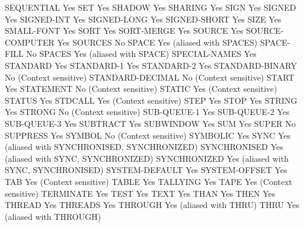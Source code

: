 SEQUENTIAL                      Yes
SET                             Yes
SHADOW                          Yes
SHARING                         Yes
SIGN                            Yes
SIGNED                          Yes
SIGNED-INT                      Yes
SIGNED-LONG                     Yes
SIGNED-SHORT                    Yes
SIZE                            Yes
SMALL-FONT                      Yes
SORT                            Yes
SORT-MERGE                      Yes
SOURCE                          Yes
SOURCE-COMPUTER                 Yes
SOURCES                         No
SPACE                           Yes (aliased with SPACES)
SPACE-FILL                      No
SPACES                          Yes (aliased with SPACE)
SPECIAL-NAMES                   Yes
STANDARD                        Yes
STANDARD-1                      Yes
STANDARD-2                      Yes
STANDARD-BINARY                 No (Context sensitive)
STANDARD-DECIMAL                No (Context sensitive)
START                           Yes
STATEMENT                       No (Context sensitive)
STATIC                          Yes (Context sensitive)
STATUS                          Yes
STDCALL                         Yes (Context sensitive)
STEP                            Yes
STOP                            Yes
STRING                          Yes
STRONG                          No (Context sensitive)
SUB-QUEUE-1                     Yes
SUB-QUEUE-2                     Yes
SUB-QUEUE-3                     Yes
SUBTRACT                        Yes
SUBWINDOW                       Yes
SUM                             Yes
SUPER                           No
SUPPRESS                        Yes
SYMBOL                          No (Context sensitive)
SYMBOLIC                        Yes
SYNC                            Yes (aliased with SYNCHRONISED, SYNCHRONIZED)
SYNCHRONISED                    Yes (aliased with SYNC, SYNCHRONIZED)
SYNCHRONIZED                    Yes (aliased with SYNC, SYNCHRONISED)
SYSTEM-DEFAULT                  Yes
SYSTEM-OFFSET                   Yes
TAB                             Yes (Context sensitive)
TABLE                           Yes
TALLYING                        Yes
TAPE                            Yes (Context sensitive)
TERMINATE                       Yes
TEST                            Yes
TEXT                            Yes
THAN                            Yes
THEN                            Yes
THREAD                          Yes
THREADS                         Yes
THROUGH                         Yes (aliased with THRU)
THRU                            Yes (aliased with THROUGH)
